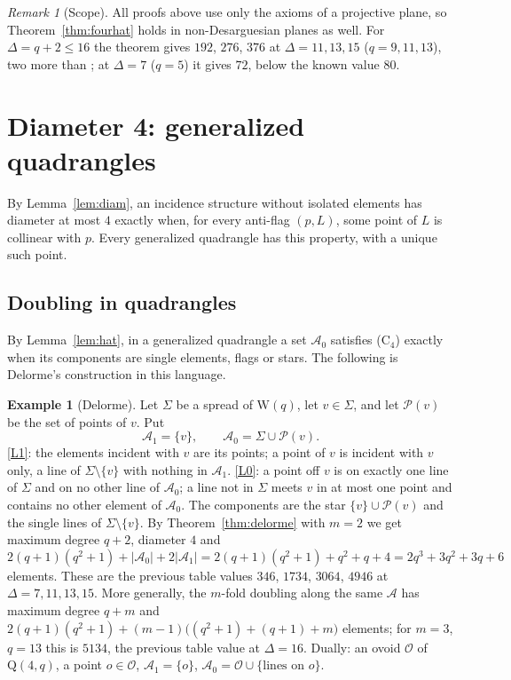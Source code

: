 \documentclass[11pt]{amsart}
\theoremstyle{definition}
\newtheorem{example}[theorem]{Example}
\theoremstyle{remark}
\newtheorem{remark}[theorem]{Remark}
\newcommand{\cP}{\mathcal{P}}
\newcommand{\cA}{\mathcal{A}}
\newcommand{\cO}{\mathcal{O}}
\newcommand{\Wq}{\mathrm{W}}
\newcommand{\Qf}{\mathrm{Q}}
\begin{document}
\begin{remark}[Scope]
All proofs above use only the axioms of a projective plane, so Theorem~\ref{thm:fourhat} holds in non-Desarguesian planes as well. For $\Delta=q+2\le16$ the theorem gives $192$, $276$, $376$ at $\Delta=11,13,15$ ($q=9,11,13$), two more than \cite{AL20}; at $\Delta=7$ ($q=5$) it gives $72$, below the known value $80$.
\end{remark}

\section{Diameter 4: generalized quadrangles}\label{sec:d4}

By Lemma~\ref{lem:diam}, an incidence structure without isolated elements has diameter at most $4$ exactly when, for every anti-flag $(p,L)$, some point of $L$ is collinear with $p$. Every generalized quadrangle has this property, with a unique such point.

\subsection{Doubling in quadrangles}
By Lemma~\ref{lem:hat}, in a generalized quadrangle a set $\cA_0$ satisfies \textup{(C$_4$)} exactly when its components are single elements, flags or stars. The following is Delorme's construction \cite[\S8(a)]{D85a} in this language.

\begin{example}[Delorme]\label{ex:delorme4}
Let $\Sigma$ be a spread of $\Wq(q)$, let $v\in\Sigma$, and let $\cP(v)$ be the set of points of $v$. Put
\[
\cA_1=\{v\},\qquad \cA_0=\Sigma\cup\cP(v).
\]
\ref{L1}: the elements incident with $v$ are its points; a point of $v$ is incident with $v$ only, a line of $\Sigma\setminus\{v\}$ with nothing in $\cA_1$. \ref{L0}: a point off $v$ is on exactly one line of $\Sigma$ and on no other line of $\cA_0$; a line not in $\Sigma$ meets $v$ in at most one point and contains no other element of $\cA_0$. The components are the star $\{v\}\cup\cP(v)$ and the single lines of $\Sigma\setminus\{v\}$. By Theorem~\ref{thm:delorme} with $m=2$ we get maximum degree $q+2$, diameter $4$ and
\[
2(q+1)(q^2+1)+|\cA_0|+2|\cA_1|=2(q+1)(q^2+1)+q^2+q+4=2q^3+3q^2+3q+6
\]
elements. These are the previous table values $346$, $1734$, $3064$, $4946$ at $\Delta=7,11,13,15$. More generally, the $m$-fold doubling along the same $\cA$ has maximum degree $q+m$ and $2(q+1)(q^2+1)+(m-1)\bigl((q^2+1)+(q+1)+m\bigr)$ elements; for $m=3$, $q=13$ this is $5134$, the previous table value at $\Delta=16$. Dually: an ovoid $\cO$ of $\Qf(4,q)$, a point $o\in\cO$, $\cA_1=\{o\}$, $\cA_0=\cO\cup\{\text{lines on }o\}$.
\end{example}
\end{document}

